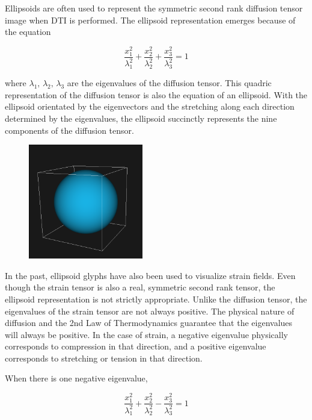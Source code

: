 \documentclass{InsightArticle}
\begin{document}
Ellipsoids are often used to represent the symmetric second rank diffusion
tensor image when DTI is performed. The ellipsoid representation emerges
because of the equation

\begin{equation}
  \frac{x_1^2}{\lambda_1^2} + \frac{x_2^2}{\lambda_2^2} + \frac{x_3^2}{\lambda_3^2} = 1
  \label{eqn:ellipsoid}
\end{equation}

where $\lambda_1 , \, \lambda_2, \, \lambda_3$ are the
eigenvalues of the diffusion tensor. This quadric representation of the
diffusion tensor is also the equation of an ellipsoid. With the ellipsoid
orientated by the eigenvectors and the stretching along each direction
determined by the eigenvalues, the ellipsoid succinctly represents the nine
components of the diffusion tensor.

\begin{figure}
\center
\includegraphics[width=5cm]{Sphere}
\label{fig:ellipsoid}
\end{figure}

In the past, ellipsoid glyphs have also been used to visualize strain fields.
Even though the strain tensor is also a real, symmetric second rank tensor,
the ellipsoid representation is not strictly appropriate. Unlike the diffusion
tensor, the eigenvalues of the strain tensor are not always positive. The
physical nature of diffusion and the 2nd Law of Thermodynamics guarantee that
the eigenvalues will always be positive. In the case of strain, a negative
eigenvalue physically corresponds to compression in that direction, and a
positive eigenvalue corresponds to stretching or tension in that direction.

When there is one negative eigenvalue,

\begin{equation}
  \frac{x_1^2}{\lambda_1^2} + \frac{x_2^2}{\lambda_2^2} - \frac{x_3^2}{\lambda_3^2} = 1
  \label{eqn:onesheet}
\end{equation}
\end{document}
